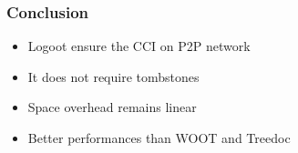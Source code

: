 \documentclass[14pt]{beamer}
\begin{document}
	\begin{frame}
		\frametitle{Conclusion}
			\begin{itemize}
				\item Logoot ensure the CCI on P2P network
				\item It does not require tombstones
				\item Space overhead remains linear
				\item Better performances than WOOT and Treedoc
			\end{itemize}
	\end{frame}
\end{document}
